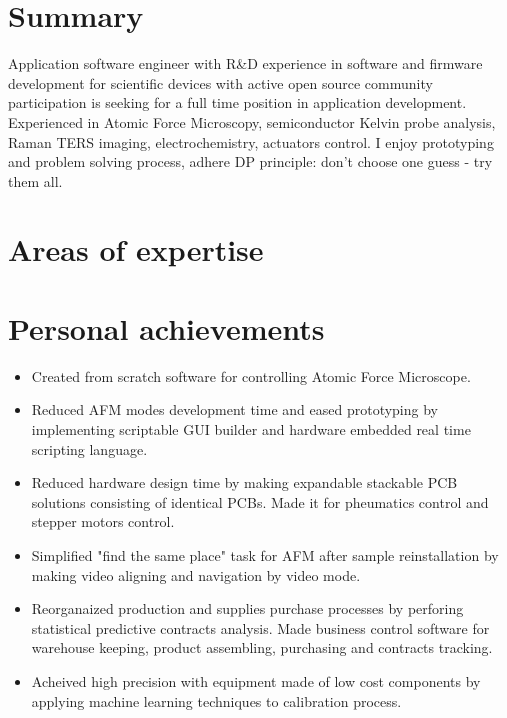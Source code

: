 \documentclass{sb_cv}
\begin{document}
\makecvtitle
\vspace*{-15mm}

\section{Summary}
Application software engineer with R\&D experience in software and firmware development for scientific devices with active open source community participation is seeking for a full time position in application development. Experienced in Atomic Force Microscopy, semiconductor Kelvin probe analysis, Raman TERS imaging, electrochemistry, actuators control. I enjoy prototyping and problem solving process, adhere DP principle: don't choose one guess - try them all.

\section{Areas of expertise}

\section{Personal achievements}
\begin{itemize}
\item Created from scratch software for controlling Atomic Force Microscope.
\item Reduced AFM modes development time and eased prototyping by implementing scriptable GUI builder and hardware embedded real time scripting language.
\item Reduced hardware design time by making expandable stackable PCB solutions consisting of identical PCBs. Made it for pheumatics control and stepper motors control.
\item Simplified "find the same place" task for AFM after sample reinstallation by making video aligning and navigation by video mode.
\item Reorganaized production and supplies purchase processes by perforing statistical predictive contracts analysis. Made business control software for warehouse keeping, product assembling, purchasing and contracts tracking.
\item Acheived high precision with equipment made of low cost components by applying machine learning techniques to calibration process.
\end{itemize}
\end{document}
